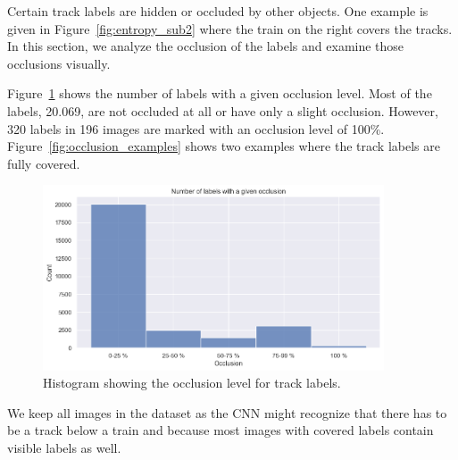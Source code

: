 \documentclass[Master,MDS,english]{BASE/twbook} %
\begin{document}
Certain track labels are hidden or occluded by other objects. One example is given in Figure~\ref{fig:entropy_sub2} where the train on the right covers the tracks.
In this section, we analyze the occlusion of the labels and examine those occlusions visually.

Figure~\ref{fig:occul_hist} shows the number of labels with a given occlusion level. Most of the labels, 20.069, are not occluded at all or have only a slight occlusion. However, 320 labels in 196 images are marked with an occlusion level of 100\%. Figure~\ref{fig:occlusion_examples} shows two examples where the track labels are fully covered.


\begin{figure}[h]
\centering
\includegraphics[width=0.9\textwidth]{images/datasets/db/occlusion_hist}
\caption{Histogram showing the occlusion level for track labels. }
\label{fig:occul_hist}
\end{figure}



We keep all images in the dataset as the CNN might recognize that there has to be a track below a train and because most images with covered labels contain visible labels as well.
\end{document}

